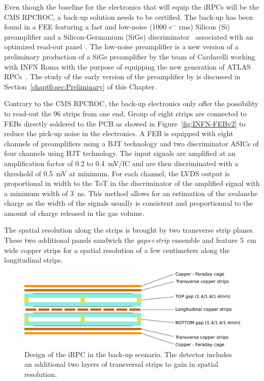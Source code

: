 	Even though the baseline for the electronics that will equip the iRPCs will be the CMS RPCROC, a back-up solution needs to be certified. The back-up has been found in a \acl{FEE} featuring a fast and low-noise (1000 $e^-$ rms) Silicon (Si) preamplifier and a Silicon-Germanium (SiGe) discriminator~\cite{PIZZIMENTO2018} associated with an optimized read-out panel~\cite{ALUNNOCAMELIA2018}. The low-noise preamplifier is a new version of a preliminary production of a SiGe preamplifier by the team of Cardarelli working with INFN Roma with the purpose of equipping the new generation of ATLAS RPCs~\cite{CARDARELLI2013}. The study of the early version of the preamplifier by is discussed in Section~\ref{chapt6:sec:Preliminary} of this Chapter.
	
	Contrary to the CMS RPCROC, the back-up electronics only offer the possibility to read-out the 96 strips from one end. Group of eight strips are connected to FEBs directly soldered to the PCB as showed in Figure~\ref{fig:INFN-FEBv2} to reduce the pick-up noise in the electronics. A FEB is equipped with eight channels of preamplifiers using a \acf{BJT} technology and two discriminator ASICs of four channels using \acf{HJT} technology. The input signals are amplified at an amplification factor of 0.2 to \SI{0.4}{mV/fC} and are then discriminated with a threshold of \SI{0.5}{mV} at minimum. For each channel, the LVDS output is proportional in width to the \acl{ToT} in the discriminator of the amplified signal with a minimum width of \SI{3}{ns}. This method allows for an estimation of the avalanche charge as the width of the signals usually is consistent and proportionnal to the amount of charge released in the gas volume.
	
	The spatial resolution along the strips is brought by two transverse strip planes. These two additional panels sandwich the \textit{gaps+strip} ensemble and feature \SI{5}{cm} wide copper strips for a spatial resolution of a few centimeters along the longitudinal strips.
	 
	\begin{figure}[H]
		\centering
		\includegraphics[width = 0.8\linewidth]{fig/chapt6/iRPC-INFN-Design.pdf}
		\caption{\label{fig:INFN-Design} Design of the iRPC in the back-up scenario. The detector includes an additional two layers of transversal strips to gain in spatial resolution.}
    \end{figure}
	 
